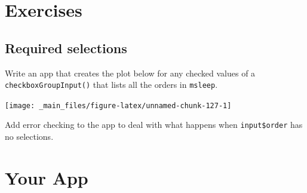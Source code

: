 \documentclass[
  oneside]{book}
\newenvironment{Shaded}{\begin{snugshade}}{\end{snugshade}}
\newcommand{\AttributeTok}[1]{\textcolor[rgb]{0.77,0.63,0.00}{#1}}
\newcommand{\CommentTok}[1]{\textcolor[rgb]{0.56,0.35,0.01}{\textit{#1}}}
\newcommand{\DecValTok}[1]{\textcolor[rgb]{0.00,0.00,0.81}{#1}}
\newcommand{\FunctionTok}[1]{\textcolor[rgb]{0.00,0.00,0.00}{#1}}
\newcommand{\NormalTok}[1]{#1}
\newcommand{\OtherTok}[1]{\textcolor[rgb]{0.56,0.35,0.01}{#1}}
\newcommand{\SpecialCharTok}[1]{\textcolor[rgb]{0.00,0.00,0.00}{#1}}
\newcommand{\StringTok}[1]{\textcolor[rgb]{0.31,0.60,0.02}{#1}}
\begin{document}
\hypertarget{exercises-debugging}{%
\section{Exercises}\label{exercises-debugging}}

\hypertarget{required-selections}{%
\subsection{Required selections}\label{required-selections}}

Write an app that creates the plot below for any checked values of a \texttt{checkboxGroupInput}\texttt{()} that lists all the orders in \texttt{msleep}.

\begin{Shaded}
\end{Shaded}

\begin{center}\texttt{[image: \_main\_files/figure-latex/unnamed-chunk-127-1]} \end{center}

Add error checking to the app to deal with what happens when \texttt{input\$order} has no selections.

\hypertarget{your-app-debugging}{%
\section{Your App}\label{your-app-debugging}}
\end{document}

